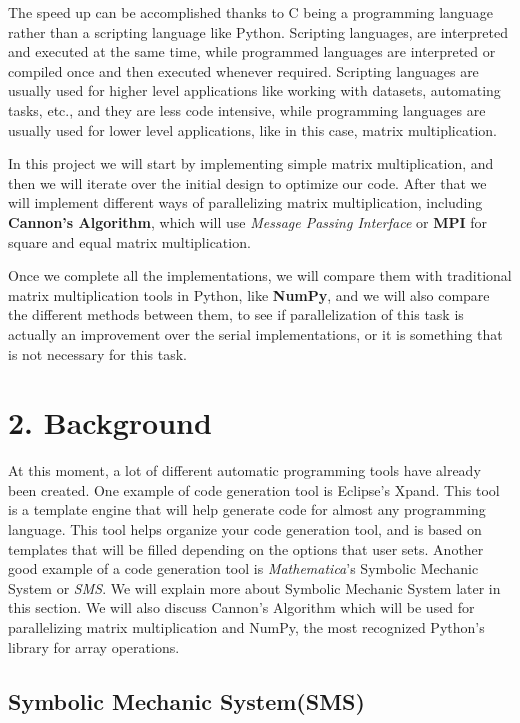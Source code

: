 \documentclass{article}
\begin{document}
The speed up can be accomplished thanks to C being a programming language rather than a scripting language like Python. Scripting languages, are interpreted and executed at the same time, while programmed languages are interpreted or compiled once and then executed whenever required. Scripting languages are usually used for higher level applications like working with datasets, automating tasks, etc., and they are less code intensive, while programming languages are usually used for lower level applications, like in this case, matrix multiplication.                               

In this project we will start by implementing simple matrix multiplication, and then we will iterate over the initial design to optimize our code. After that we will implement different ways of parallelizing matrix multiplication, including \textbf{Cannon's Algorithm}, which will use \textit{Message Passing Interface} or \textbf{MPI} for square and equal matrix multiplication.

Once we complete all the implementations, we will compare them with traditional matrix multiplication tools in Python, like \textbf{NumPy}, and we will also compare the different methods between them, to see if parallelization of this task is actually an improvement over the serial implementations, or it is something that is not necessary for this task.


\section*{2. Background}

At this moment, a lot of different automatic programming tools have already been created. One example of code generation tool is Eclipse's Xpand. This tool is a template engine that will help generate code for almost any programming language. This tool helps organize your code generation tool, and is based on templates that will be filled depending on the options that user sets. Another good example of a code generation tool is \textit{Mathematica}'s Symbolic Mechanic System or \textit{SMS}. We will explain more about Symbolic Mechanic System later in this section. We will also discuss Cannon's Algorithm which will be used for parallelizing matrix multiplication and NumPy, the most recognized Python's library for array operations.

\subsection*{Symbolic Mechanic System(SMS)}
\end{document}
